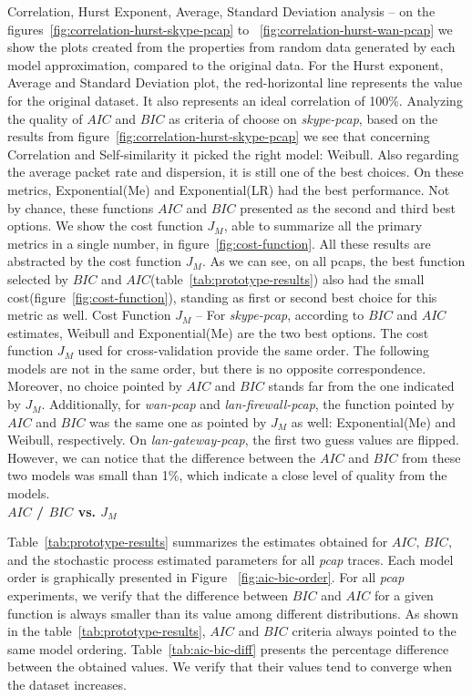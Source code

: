 Correlation, Hurst Exponent, Average, Standard Deviation analysis -- on the figures~\ref{fig:correlation-hurst-skype-pcap} to ~\ref{fig:correlation-hurst-wan-pcap} we show the plots created from the properties from random data generated by each model approximation, compared to the original data. For the Hurst exponent, Average and Standard Deviation plot, the red-horizontal line represents the value for the original dataset. It also represents an ideal correlation of 100\%. Analyzing the quality of $AIC$ and $BIC$ as criteria of choose on \textit{skype-pcap}, based on the results from figure~\ref{fig:correlation-hurst-skype-pcap} we see that concerning Correlation and Self-similarity it picked the right model: Weibull. Also regarding the average packet rate and dispersion, it is still one of the best choices. On these metrics, Exponential(Me) and Exponential(LR) had the best performance. Not by chance, these functions $AIC$ and $BIC$ presented as the second and third best options. We show the cost function $J_M$, able to summarize all the primary metrics in a single number, in figure~\ref{fig:cost-function}. All these results are abstracted by the cost function $J_M$. As we can see, on all pcaps, the best function selected by $BIC$ and $AIC$(table~\ref{tab:prototype-results}) also had the small cost(figure~\ref{fig:cost-function}), standing as first or second best choice for this metric as well. Cost Function $J_M$ -- For \textit{skype-pcap}, according to $BIC$ and $AIC$ estimates, Weibull and Exponential(Me) are the two best options. The cost function $J_M$ used for cross-validation provide the same order. The following models are not in the same order, but there is no opposite correspondence. Moreover, no choice pointed by $AIC$ and $BIC$ stands far from the one indicated by $J_M$.
Additionally, for \textit{wan-pcap} and \textit{lan-firewall-pcap}, the function pointed by $AIC$ and $BIC$ was the same one as pointed by $J_M$ as well: Exponential(Me) and Weibull, respectively. On \textit{lan-gateway-pcap}, the first two guess values are flipped. However, we can notice that the difference between the $AIC$ and $BIC$ from these two models was small than 1\%, which indicate a close level of quality from the models.\\


 \noindent  \textbf{$AIC$ / $BIC$ vs. $J_M$}

Table~\ref{tab:prototype-results} summarizes the estimates obtained  for $AIC$, $BIC$, and the stochastic process estimated parameters for all \textit{pcap} traces. Each model order is graphically presented in Figure ~\ref{fig:aic-bic-order}.  For all \textit{pcap} experiments, we verify that the difference between $BIC$ and $AIC$ for a given function is always smaller than its value among different distributions. As shown in the table~\ref{tab:prototype-results}, $AIC$ and $BIC$ criteria always pointed to the same model ordering. Table~\ref{tab:aic-bic-diff} presents the percentage difference between the obtained values. We verify that their values tend to converge when the dataset increases. 


